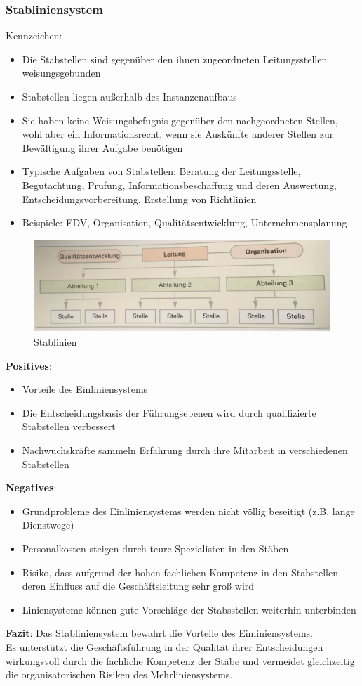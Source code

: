 \documentclass[10pt]{article}
\begin{document}
\subsubsection{Stabliniensystem}
Kennzeichen:
\begin{itemize}
\item Die Stabstellen sind gegenüber den ihnen zugeordneten Leitungsstellen weisungsgebunden
\item Stabstellen liegen außerhalb des Instanzenaufbaus
\item Sie haben keine Weisungsbefugnis gegenüber den nachgeordneten Stellen, wohl aber ein Informationsrecht, wenn sie Auskünfte anderer Stellen zur Bewältigung ihrer Aufgabe benötigen
\item Typische Aufgaben von Stabstellen: Beratung der Leitungsstelle, Begutachtung, Prüfung, Informationsbeschaffung und deren Auswertung, Entscheidungsvorbereitung, Erstellung von Richtlinien
\item Beispiele: EDV, Organisation, Qualitätsentwicklung, Unternehmensplanung
\end{itemize}
\begin{figure}[H]
  \begin{center}
  \includegraphics[width=12cm]{stablinien.png}
  \end{center}
  \caption{Stablinien}
  \label{fig:Stablinien}
\end{figure}
\textbf{Positives}:
\begin{itemize}
\item Vorteile des Einliniensystems
\item Die Entscheidungsbasis der Führungsebenen wird durch qualifizierte Stabstellen verbessert
\item Nachwuchskräfte sammeln Erfahrung durch ihre Mitarbeit in verschiedenen Stabstellen
\end{itemize}
\textbf{Negatives}:
\begin{itemize}
\item Grundprobleme des Einliniensystems werden nicht völlig beseitigt (z.B. lange Dienstwege)
\item Personalkosten steigen durch teure Spezialisten in den Stäben
\item Risiko, dass aufgrund der hohen fachlichen Kompetenz in den Stabstellen deren Einfluss auf die Geschäftsleitung sehr groß wird
\item Liniensysteme können gute Vorschläge der Stabsstellen weiterhin unterbinden 
\end{itemize}
\textbf{Fazit}:
Das Stabliniensystem bewahrt die Vorteile des Einliniensystems. \\ 
Es unterstützt die Geschäftsführung in der Qualität ihrer Entscheidungen wirkungsvoll durch die fachliche Kompetenz der Stäbe und vermeidet gleichzeitig die organisatorischen Risiken des Mehrliniensystems.
\end{document}
